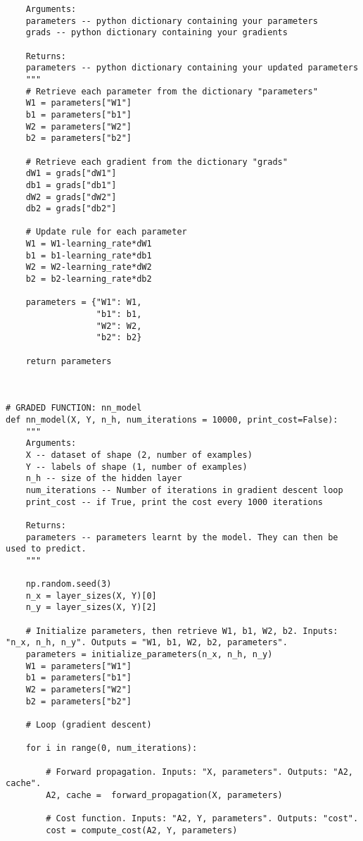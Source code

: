 \begin{verbatim}
    Arguments:
    parameters -- python dictionary containing your parameters 
    grads -- python dictionary containing your gradients 
    
    Returns:
    parameters -- python dictionary containing your updated parameters 
    """
    # Retrieve each parameter from the dictionary "parameters"
    W1 = parameters["W1"]
    b1 = parameters["b1"]
    W2 = parameters["W2"]
    b2 = parameters["b2"]

    # Retrieve each gradient from the dictionary "grads"
    dW1 = grads["dW1"]
    db1 = grads["db1"]
    dW2 = grads["dW2"]
    db2 = grads["db2"]
    
    # Update rule for each parameter
    W1 = W1-learning_rate*dW1
    b1 = b1-learning_rate*db1
    W2 = W2-learning_rate*dW2
    b2 = b2-learning_rate*db2
    
    parameters = {"W1": W1,
                  "b1": b1,
                  "W2": W2,
                  "b2": b2}
    
    return parameters



# GRADED FUNCTION: nn_model
def nn_model(X, Y, n_h, num_iterations = 10000, print_cost=False):
    """
    Arguments:
    X -- dataset of shape (2, number of examples)
    Y -- labels of shape (1, number of examples)
    n_h -- size of the hidden layer
    num_iterations -- Number of iterations in gradient descent loop
    print_cost -- if True, print the cost every 1000 iterations
    
    Returns:
    parameters -- parameters learnt by the model. They can then be used to predict.
    """
    
    np.random.seed(3)
    n_x = layer_sizes(X, Y)[0]
    n_y = layer_sizes(X, Y)[2]
    
    # Initialize parameters, then retrieve W1, b1, W2, b2. Inputs: "n_x, n_h, n_y". Outputs = "W1, b1, W2, b2, parameters".
    parameters = initialize_parameters(n_x, n_h, n_y)
    W1 = parameters["W1"]
    b1 = parameters["b1"]
    W2 = parameters["W2"]
    b2 = parameters["b2"]
    
    # Loop (gradient descent)

    for i in range(0, num_iterations):
         
        # Forward propagation. Inputs: "X, parameters". Outputs: "A2, cache".
        A2, cache =  forward_propagation(X, parameters)
        
        # Cost function. Inputs: "A2, Y, parameters". Outputs: "cost".
        cost = compute_cost(A2, Y, parameters)
 

\end{verbatim}
